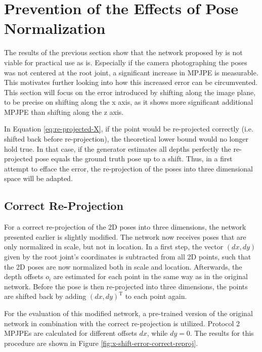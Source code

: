 \section{Prevention of the Effects of Pose Normalization}
\label{sec:network-adjusting}

The results of the previous section show that the network proposed by \citet{drover18} is not viable for practical use as is.
Especially if the camera photographing the poses was not centered at the root joint, a significant increase in MPJPE is measurable.
This motivates further looking into how this increased error can be circumvented.
This section will focus on the error introduced by shifting along the image plane, to be precise on shifting along the x axis, as it shows more significant additional MPJPE than shifting along the z axis.

In Equation \eqref{eq:re-projected-X}, if the point would be re-projected correctly (i.e. shifted back before re-projection), the theoretical lower bound would no longer hold true.
In that case, if the generator estimates all depths perfectly the re-projected pose equals the ground truth pose up to a shift.
Thus, in a first attempt to efface the error, the re-projection of the poses into three dimensional space will be adapted.

\subsection{Correct Re-Projection}

For a correct re-projection of the 2D poses into three dimensions, the network presented earlier is slightly modified.
The network now receives poses that are only normalized in scale, but not in location.
In a first step, the vector $(dx, dy)$ given by the root joint's coordinates is subtracted from all 2D points, such that the 2D poses are now normalized both in scale and location.
Afterwards, the depth offsets $o_i$ are estimated for each point in the same way as in the original network.
Before the pose is then re-projected into three dimensions, the points are shifted back by adding $(dx, dy)^\mathrm{T}$ to each point again.



For the evaluation of this modified network, a pre-trained version of the original network in combination with the correct re-projection is utilized.
Protocol 2 MPJPEs are calculated for different offsets $dx$, while $dy = 0$.
The results for this procedure are shown in Figure \ref{fig:x-shift-error-correct-reproj}.

